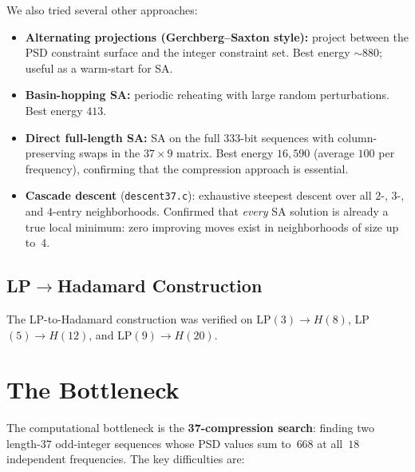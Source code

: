 \documentclass[11pt,a4paper]{article}
\theoremstyle{plain}
\theoremstyle{definition}
\theoremstyle{remark}
\begin{document}
We also tried several other approaches:
\begin{itemize}
\item \textbf{Alternating projections (Gerchberg--Saxton style):} project between the PSD constraint surface and the integer constraint set. Best energy $\sim880$; useful as a warm-start for SA.
\item \textbf{Basin-hopping SA:} periodic reheating with large random perturbations. Best energy $413$.
\item \textbf{Direct full-length SA:} SA on the full $333$-bit sequences with column-preserving swaps in the $37\times9$ matrix. Best energy $16{,}590$ (average $100$ per frequency), confirming that the compression approach is essential.
\item \textbf{Cascade descent} (\texttt{descent37.c}): exhaustive steepest descent over all $2$-, $3$-, and $4$-entry neighborhoods. Confirmed that \emph{every} SA solution is already a true local minimum: zero improving moves exist in neighborhoods of size up to~$4$.
\end{itemize}

\subsection{LP$\to$Hadamard Construction}
The LP-to-Hadamard construction was verified on LP$(3)\to H(8)$, LP$(5)\to H(12)$, and LP$(9)\to H(20)$.

\section{The Bottleneck}

The computational bottleneck is the \textbf{37-compression search}: finding two length-$37$ odd-integer sequences whose PSD values sum to~$668$ at all~$18$ independent frequencies. The key difficulties are:
\end{document}
